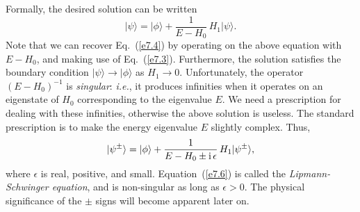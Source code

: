 Formally, the desired solution can be written
\begin{equation}
|\psi\rangle =|\phi\rangle +\frac{1}{E-H_0} \,H_1 |\psi\rangle.
\end{equation}
Note that we can recover Eq.~(\ref{e7.4}) by operating on the above equation
with $E-H_0$, and making use of Eq.~(\ref{e7.3}). Furthermore, the solution
satisfies the boundary condition $|\psi\rangle \rightarrow |\phi
\rangle$ as $H_1\rightarrow 0$. Unfortunately, the operator
$(E-H_0)^{-1}$ is {\em singular}: {\em i.e.}, it produces infinities when it
operates on an eigenstate of $H_0$ corresponding to the eigenvalue $E$. 
We need a prescription for dealing with these infinities, 
otherwise the above solution  is useless. The standard prescription is
to make the energy eigenvalue $E$ slightly complex. Thus,
\begin{equation}\label{e7.6}
|\psi^\pm\rangle =|\phi\rangle +\frac{1}{E-H_0\pm {\rm i}\,\epsilon} 
\,H_1 |\psi^\pm\rangle,
\end{equation}
where $\epsilon$ is real, positive, and small. Equation~(\ref{e7.6}) is called
the {\em Lipmann-Schwinger equation}, and is non-singular
as long as $\epsilon>0$.  The physical significance of the
$\pm$ signs will become apparent later on.


